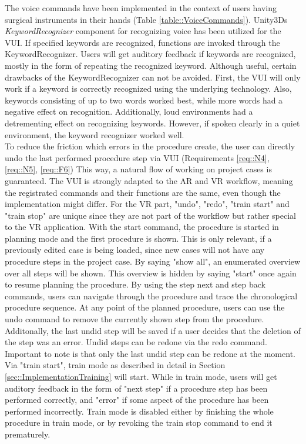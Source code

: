 The voice commands have been implemented in the context of users having surgical instruments in their hands (Table \ref{table::VoiceCommands}).
Unity3Ds \textit{KeywordRecognizer} component for recognizing voice has been utilized for the VUI.
If specified keywords are recognized, functions are invoked through the KeywordRecognizer.
Users will get auditory feedback if keywords are recognized, mostly in the form of repeating the recognized keyword.
Although useful, certain drawbacks of the KeywordRecognizer can not be avoided.
First, the VUI will only work if a keyword is correctly recognized using the underlying technology.
Also, keywords consisting of up to two words worked best, while more words had a negative effect on recognition.
Additionally, loud environments had a detrementing effect on recognizing keywords.
However, if spoken clearly in a quiet environment, the keyword recognizer worked well.
\\ To reduce the friction which errors in the procedure create, the user can directly undo the last performed procedure step via VUI (Requirements \ref{req::N4}, \ref{req::N5}, \ref{req::F6})
This way, a natural flow of working on project cases is guaranteed.
The VUI is strongly adapted to the AR and VR workflow, meaning the registrated commands and their functions are the same, even though the implementation might differ.
For the VR part, "undo", "redo", "train start" and "train stop" are unique since they are not part of the workflow but rather special to the VR application.
With the start command, the procedure is started in planning mode and the first procedure is shown.
This is only relevant, if a previously edited case is being loaded, since new cases will not have any procedure steps in the project case.
By saying "show all", an enumerated overview over all steps will be shown. This overview is hidden by saying "start" once again to resume planning the procedure.
By using the step next and step back commands, users can navigate through the procedure and trace the chronological procedure sequence.
At any point of the planned procedure, users can use the undo command to remove the currently shown step from the procedure.
Additonally, the last undid step will be saved if a user decides that the deletion of the step was an error.
Undid steps can be redone via the redo command.
Important to note is that only the last undid step can be redone at the moment.
Via "train start", train mode as described in detail in Section \ref{sec::ImplementationTraining} will start.
While in train mode, users will get auditory feedback in the form of "next step" if a procedure step has been performed correctly, and "error" if some aspect of the procedure has 
been performed incorrectly.
Train mode is disabled either by finishing the whole procedure in train mode, or by revoking the train stop command to end it prematurely.